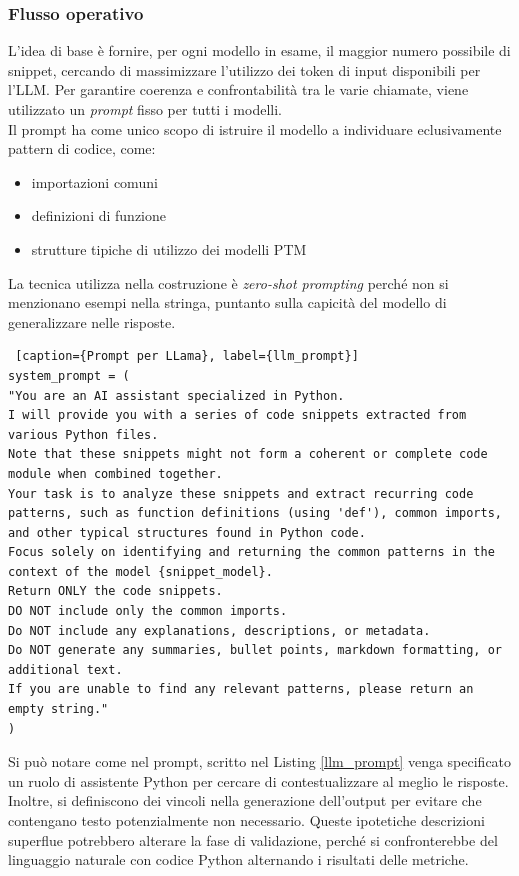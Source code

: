 \documentclass{article}
\begin{document}
\subsubsection{Flusso operativo}
L'idea di base è fornire, per ogni modello in esame, il maggior numero possibile di snippet, cercando di massimizzare l’utilizzo dei token di input disponibili per l’LLM. Per garantire coerenza e confrontabilità tra le varie chiamate, viene utilizzato un \textit{prompt} fisso per tutti i modelli. \\
Il prompt ha come unico scopo di istruire il modello a individuare eclusivamente pattern di codice, come:
\begin{itemize}
    \item importazioni comuni
    \item definizioni di funzione
    \item strutture tipiche di utilizzo dei modelli PTM
\end{itemize}
La tecnica utilizza nella costruzione è \textit{zero-shot prompting} perché non si menzionano esempi nella stringa, puntanto sulla capicità del modello di generalizzare nelle risposte.
\begin{lstlisting} [caption={Prompt per LLama}, label={llm_prompt}]
system_prompt = (
"You are an AI assistant specialized in Python.
I will provide you with a series of code snippets extracted from various Python files.
Note that these snippets might not form a coherent or complete code module when combined together.
Your task is to analyze these snippets and extract recurring code patterns, such as function definitions (using 'def'), common imports, and other typical structures found in Python code.
Focus solely on identifying and returning the common patterns in the context of the model {snippet_model}.
Return ONLY the code snippets.
DO NOT include only the common imports.
Do NOT include any explanations, descriptions, or metadata.
Do NOT generate any summaries, bullet points, markdown formatting, or additional text.
If you are unable to find any relevant patterns, please return an empty string."
)    
\end{lstlisting}
Si può notare come nel prompt, scritto nel Listing \ref{llm_prompt} venga specificato un ruolo di assistente Python per cercare di contestualizzare al meglio le risposte. Inoltre, si definiscono dei vincoli nella generazione dell'output per evitare che contengano testo potenzialmente non necessario. Queste ipotetiche descrizioni superflue potrebbero alterare la fase di validazione, perché si confronterebbe del linguaggio naturale con codice Python alternando i risultati delle metriche.
\end{document}
